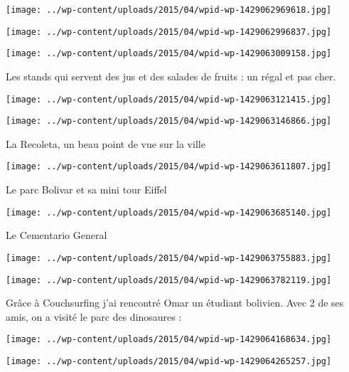 \centerline{\texttt{[image: ../wp-content/uploads/2015/04/wpid-wp-1429062969618.jpg]} } 
 \newline
 \newline
\centerline{\texttt{[image: ../wp-content/uploads/2015/04/wpid-wp-1429062996837.jpg]} } 
 \newline
 \newline
\centerline{\texttt{[image: ../wp-content/uploads/2015/04/wpid-wp-1429063009158.jpg]} } 
 \newline
 Les stands qui servent des jus et des salades de fruits : un régal et pas cher.  \newline
 \newline
\centerline{\texttt{[image: ../wp-content/uploads/2015/04/wpid-wp-1429063121415.jpg]} } 
 \newline
 \newline
\centerline{\texttt{[image: ../wp-content/uploads/2015/04/wpid-wp-1429063146866.jpg]} } 
 \newline
 La Recoleta, un beau point de vue sur la ville \newline
 \newline
\centerline{\texttt{[image: ../wp-content/uploads/2015/04/wpid-wp-1429063611807.jpg]} } 
 \newline
 Le parc Bolivar et sa mini tour Eiffel \newline
 \newline
\centerline{\texttt{[image: ../wp-content/uploads/2015/04/wpid-wp-1429063685140.jpg]} } 
 \newline
 Le Cementario General \newline
 \newline
\centerline{\texttt{[image: ../wp-content/uploads/2015/04/wpid-wp-1429063755883.jpg]} } 
 \newline
 \newline
\centerline{\texttt{[image: ../wp-content/uploads/2015/04/wpid-wp-1429063782119.jpg]} } 
 \newline
 Grâce à Couchsurfing j'ai rencontré Omar un étudiant bolivien. Avec 2 de ses amis, on a visité le parc des dinosaures : \newline
 \newline
\centerline{\texttt{[image: ../wp-content/uploads/2015/04/wpid-wp-1429064168634.jpg]} } 
 \newline
 \newline
\centerline{\texttt{[image: ../wp-content/uploads/2015/04/wpid-wp-1429064265257.jpg]} } 
